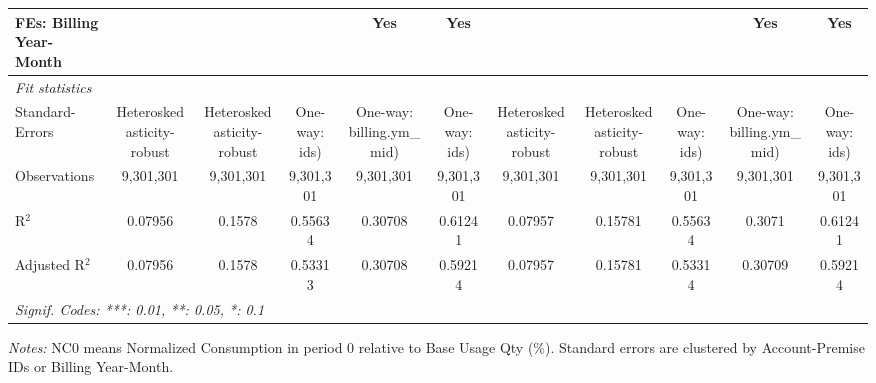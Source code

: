 \begin{table}[htbp]
\begin{tabular}{lcccccccccc}
FEs: Billing Year-Month &  &  &  & Yes & Yes &  &  &  & Yes & Yes\\
\midrule
\emph{Fit statistics}&  & & & & & & & & & \\
Standard-Errors& Heteroskedasticity-robust&Heteroskedasticity-robust&One-way: ids)&One-way: billing.ym\_mid)&One-way: ids)&Heteroskedasticity-robust&Heteroskedasticity-robust&One-way: ids)&One-way: billing.ym\_mid)&One-way: ids)\\
Observations & 9,301,301&9,301,301&9,301,301&9,301,301&9,301,301&9,301,301&9,301,301&9,301,301&9,301,301&9,301,301\\
R$^2$ & 0.07956&0.1578&0.55634&0.30708&0.61241&0.07957&0.15781&0.55634&0.3071&0.61241\\
Adjusted R$^2$ & 0.07956&0.1578&0.53313&0.30708&0.59214&0.07957&0.15781&0.53314&0.30709&0.59214\\
\bottomrule\bottomrule
\multicolumn{11}{l}{\emph{Signif. Codes: ***: 0.01, **: 0.05, *: 0.1}}\\
\end{tabular}

\emph{\medskip Notes:} NC0 means Normalized Consumption in period 0 relative to Base Usage Qty (\%). Standard errors are clustered by Account-Premise IDs or Billing Year-Month.
\end{table}